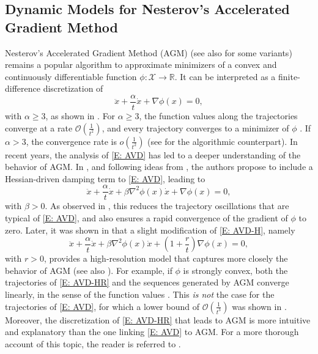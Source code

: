 \documentclass[pdflatex,sn-mathphys-num]{sn-jnl}
\theoremstyle{thmstyleone}
\theoremstyle{thmstyletwo}
\theoremstyle{thmstylethree}
\newcommand{\R}{\mathbb{R}}
\newcommand{\X}{\mathcal{X}}
\begin{document}
\subsection*{Dynamic Models for Nesterov's Accelerated Gradient Method}

Nesterov's Accelerated Gradient Method (AGM) \cite{Nesterov_1983} (see also \cite{Beck_2009,Kim_2016,Park_2023} for some variants) remains a popular algorithm to approximate minimizers of a convex and continuously differentiable function $\phi:\X\to\R$. It can be interpreted as a finite-difference discretization of 
\begin{equation}\label{E: AVD}\tag{AVD}
\ddot{x} + \frac{\alpha}{t}\dot{x} + \nabla \phi(x) = 0,
\end{equation}
with $\alpha\ge 3$, as shown in \cite{Su_2016}. For $\alpha\ge 3$, the function values along the trajectories converge at a rate $\mathcal O(\frac{1}{t^2})$, and every trajectory converges to a minimizer of $\phi$ \cite{Attouch_2018,Ryu_2025}. If $\alpha>3$, the convergence rate is $o(\frac{1}{t^2})$ \cite{May_2017} (see \cite{Attouch_2016} for the algorithmic counterpart). In recent years, the analysis of \eqref{E: AVD} has led to a deeper understanding of the behavior of AGM. In \cite{Attouch_2016_Hessian}, and following ideas from \cite{Alvarez_2002}, the authors propose to include a Hessian-driven damping term to \eqref{E: AVD}, leading to
\begin{equation}\label{E: AVD-H}\tag{AVD-H}
\ddot{x} + \frac{\alpha}{t}\dot{x} + \beta\nabla^2 \phi(x)\dot{x} + \nabla \phi(x) = 0,
\end{equation} 
with $\beta>0$. As observed in \cite{Alvarez_2002,Attouch_2016_Hessian}, this reduces the trajectory oscillations that are typical of \eqref{E: AVD}, and also ensures a rapid convergence of the gradient of $\phi$ to zero. Later, it was shown in \cite{Shi_2022} that a slight modification of \eqref{E: AVD-H}, namely
\begin{equation}\label{E: AVD-HR}\tag{AVD-HR}
\ddot{x} + \frac{\alpha}{t}\dot{x} + \beta\nabla^2 \phi(x)\dot{x} + \left(1+\frac{r}{t}\right)\nabla \phi(x) = 0,
\end{equation} 
with $r>0$, provides a high-resolution model that captures more closely the behavior of AGM (see also \cite{Shi_2024}). For example, if $\phi$ is strongly convex, both the trajectories of \eqref{E: AVD-HR} and the sequences generated by AGM converge linearly, in the sense of the function values \cite{Shi_2024}. This {\it is not} the case for the trajectories of \eqref{E: AVD}, for which a lower bound of $\mathcal O(\frac{1}{t^3})$ was shown in \cite{Su_2016}. Moreover, the discretization of \eqref{E: AVD-HR} that leads to AGM is more intuitive and explanatory than the one linking \eqref{E: AVD} to AGM. For a more thorough account of this topic, the reader is referred to \cite{Wang_2025_AVD}.
\end{document}
